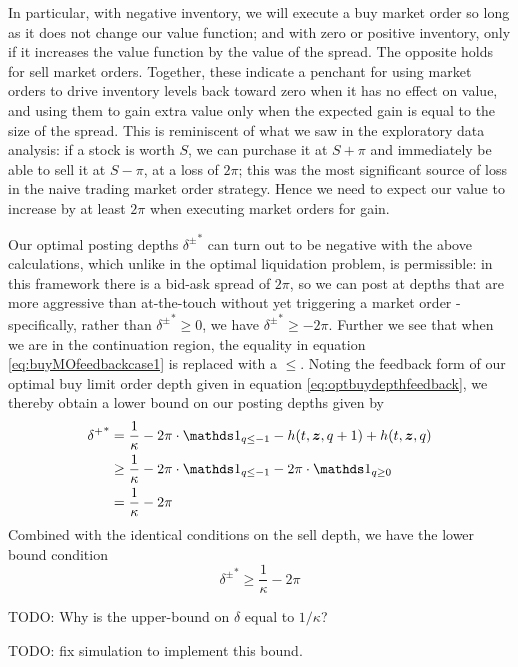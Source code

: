 In particular, with negative inventory, we will execute a buy market order so long as it does not change our value function; and with zero or positive inventory, only if it increases the value function by the value of the spread. The opposite holds for sell market orders. Together, these indicate a penchant for using market orders to drive inventory levels back toward zero when it has no effect on value, and using them to gain extra value only when the expected gain is equal to the size of the spread. This is reminiscent of what we saw in the exploratory data analysis: if a stock is worth $S$, we can purchase it at $S+\pi$ and immediately be able to sell it at $S-\pi$, at a loss of $2 \pi$; this was the most significant source of loss in the naive trading market order strategy. Hence we need to expect our value to increase by at least $2\pi$ when executing market orders for gain.

Our optimal posting depths ${\delta^\pm}^*$ can turn out to be negative with the above calculations, which unlike in the optimal liquidation problem, is permissible: in this framework there is a bid-ask spread of $2\pi$, so we can post at depths that are more aggressive than at-the-touch without yet triggering a market order - specifically, rather than ${\delta^\pm}^* \geq 0$, we have ${\delta^\pm}^* \geq -2\pi$. Further we see that when we are in the continuation region, the equality in equation \ref{eq:buyMOfeedbackcase1} is replaced with a $\leq$. Noting the feedback form of our optimal buy limit order depth given in equation \ref{eq:optbuydepthfeedback}, we thereby obtain a lower bound on our posting depths given by
\begin{align*}
{\delta^+}^* & = \frac{1}{\kappa} - 2 \pi \cdot \indicator_{q \leq -1} - h(t,\bz,q+1) + h(t,\bz,q) \\
& \geq \frac{1}{\kappa} - 2 \pi \cdot \indicator_{q \leq -1} - 2 \pi \cdot \indicator_{q \geq 0} \\
& = \frac{1}{\kappa} - 2\pi
\end{align*}
Combined with the identical conditions on the sell depth, we have the lower bound condition
\begin{equation}
\label{eq:deltaslowerboundcase1}
\boxed{ {\delta^\pm}^* \geq \frac{1}{\kappa} - 2\pi }
\end{equation}

TODO: Why is the upper-bound on $\delta$ equal to $1/\kappa$?

TODO: fix simulation to implement this bound. 



